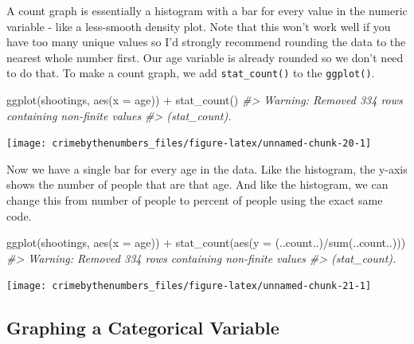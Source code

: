 \documentclass[
]{krantz}
\makeatletter
\newenvironment{Shaded}{\begin{snugshade}}{\end{snugshade}}
\newcommand{\AttributeTok}[1]{\textcolor[rgb]{0.61,0.61,0.61}{#1}}
\newcommand{\CommentTok}[1]{\textcolor[rgb]{0.37,0.37,0.37}{\textit{#1}}}
\newcommand{\FunctionTok}[1]{\textcolor[rgb]{0,0,0}{#1}}
\newcommand{\NormalTok}[1]{#1}
\newcommand{\SpecialCharTok}[1]{\textcolor[rgb]{0,0,0}{#1}}
\newenvironment{kframe}{%
\medskip{}
\setlength{\fboxsep}{.8em}
 \def\at@end@of@kframe{}%
 \ifinner\ifhmode%
  \def\at@end@of@kframe{\end{minipage}}%
  \begin{minipage}{\columnwidth}%
 \fi\fi%
 \def\FrameCommand##1{\hskip\@totalleftmargin \hskip-\fboxsep
 \colorbox{shadecolor}{##1}\hskip-\fboxsep
     \hskip-\linewidth \hskip-\@totalleftmargin \hskip\columnwidth}%
 \MakeFramed {\advance\hsize-\width
   \@totalleftmargin\z@ \linewidth\hsize
   \@setminipage}}%
 {\par\unskip\endMakeFramed%
 \at@end@of@kframe}
\renewenvironment{Shaded}{\begin{kframe}}{\end{kframe}}
\makeatother
\begin{document}
A count graph is essentially a histogram with a bar for every value in the numeric variable - like a less-smooth density plot. Note that this won't work well if you have too many unique values so I'd strongly recommend rounding the data to the nearest whole number first. Our age variable is already rounded so we don't need to do that. To make a count graph, we add \texttt{stat\_count()} to the \texttt{ggplot()}.

\begin{Shaded}
\begin{Highlighting}[]
\FunctionTok{ggplot}\NormalTok{(shootings, }\FunctionTok{aes}\NormalTok{(}\AttributeTok{x =}\NormalTok{ age)) }\SpecialCharTok{+} \FunctionTok{stat\_count}\NormalTok{()}
\CommentTok{\#\textgreater{} Warning: Removed 334 rows containing non{-}finite values}
\CommentTok{\#\textgreater{} (stat\_count).}
\end{Highlighting}
\end{Shaded}

\begin{center}\texttt{[image: crimebythenumbers\_files/figure-latex/unnamed-chunk-20-1]} \end{center}

Now we have a single bar for every age in the data. Like the histogram, the y-axis shows the number of people that are that age. And like the histogram, we can change this from number of people to percent of people using the exact same code.

\begin{Shaded}
\begin{Highlighting}[]
\FunctionTok{ggplot}\NormalTok{(shootings, }\FunctionTok{aes}\NormalTok{(}\AttributeTok{x =}\NormalTok{ age)) }\SpecialCharTok{+} \FunctionTok{stat\_count}\NormalTok{(}\FunctionTok{aes}\NormalTok{(}\AttributeTok{y =}\NormalTok{ (..count..)}\SpecialCharTok{/}\FunctionTok{sum}\NormalTok{(..count..)))}
\CommentTok{\#\textgreater{} Warning: Removed 334 rows containing non{-}finite values}
\CommentTok{\#\textgreater{} (stat\_count).}
\end{Highlighting}
\end{Shaded}

\begin{center}\texttt{[image: crimebythenumbers\_files/figure-latex/unnamed-chunk-21-1]} \end{center}

\hypertarget{graphing-a-categorical-variable}{%
\subsection{Graphing a Categorical Variable}\label{graphing-a-categorical-variable}}
\end{document}
